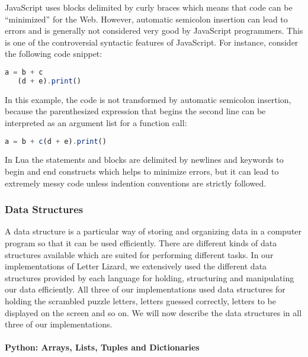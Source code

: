 JavaScript uses blocks delimited by curly braces which means that code can be ``minimized'' for the Web. However, automatic semicolon insertion can lead to errors and is generally not considered very good by JavaScript programmers. This is one of the controversial syntactic features of JavaScript. For instance, consider the following code snippet:
\begin{lstlisting}[language={JavaScript},caption=An example where automatic semicolon insertion in JavaScript may lead to unexpected results]
	a = b + c
   (d + e).print()
\end{lstlisting}
In this example, the code is not transformed by automatic semicolon insertion, because the parenthesized expression that begins the second line can be interpreted as an argument list for a function call:
\begin{lstlisting}[language={JavaScript},caption=The interpretation of the previous example]
	a = b + c(d + e).print()
\end{lstlisting}

In Lua the statements and blocks are delimited by newlines and keywords to begin and end constructs which helps to minimize errors, but it can lead to extremely messy code unless indention conventions are strictly followed.


\subsubsection{Data Structures}

A data structure is a particular way of storing and organizing data in a computer program so that it can be used efficiently. There are different kinds of data structures available which are suited for performing different tasks. In our implementations of Letter Lizard, we extensively used the different data structures provided by each language for holding, structuring and manipulating our data efficiently. All three of our implementations used data structures for holding the scrambled puzzle letters, letters guessed correctly, letters to be displayed on the screen and so on. We will now describe the data structures in all three of our implementations.

\paragraph{Python: Arrays, Lists, Tuples and Dictionaries}

